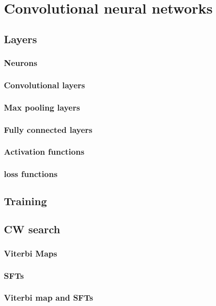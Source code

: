 \chapter{\label{cnn}Convolutional neural networks}

\section{Layers}

\subsection{Neurons}

\subsection{Convolutional layers}

\subsection{Max pooling layers}

\subsection{Fully connected layers}

\subsection{Activation functions}

\subsection{loss functions}

\section{Training}

\section{CW search}

\subsection{Viterbi Maps}

\subsection{SFTs}

\subsection{Viterbi map and SFTs}